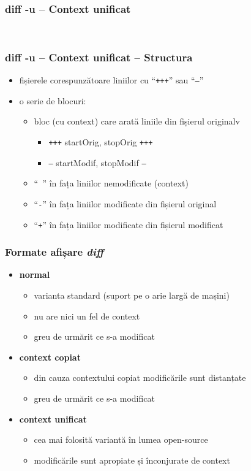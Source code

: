 \documentclass{beamer}
\begin{document}
\begin{frame}
  \frametitle{\textbf{diff -u} – Context unificat}
  \tt{}
\end{frame}

\begin{frame}
  \frametitle{\textbf{diff -u} – Context unificat – Structura}
  \begin{itemize}
  \item fișierele corespunzătoare liniilor cu ``\texttt{\texttt{+++}}'' sau ``\texttt{---}''
    \item o serie de blocuri:
      \begin{itemize}
      \item bloc (cu context) care arată liniile din fișierul originalv
        \begin{itemize} 
        \item \texttt{+++} startOrig, stopOrig \texttt{+++}
        \item \texttt{---} startModif, stopModif \texttt{---}
        \end{itemize}
      \item ``\texttt{ }'' în fața liniilor nemodificate (context)
      \item ``\texttt{-}'' în fața liniilor modificate din fișierul original
      \item ``\texttt{+}'' în fața liniilor modificate din fișierul modificat
      \end{itemize}
  \end{itemize}
\end{frame}

\begin{frame}
  \frametitle{\textbf Formate afișare \textit{diff}}
  \begin{itemize}[<+->]
    \item \textbf{normal}
      \begin{itemize}[<+->]
        \item varianta standard (suport pe o arie largă de mașini)
        \item nu are nici un fel de context
        \item greu de urmărit ce s-a modificat
      \end{itemize}

    \item \textbf{context copiat}
      \begin{itemize}
        \item din cauza contextului copiat modificările sunt distanțate
        \item greu de urmărit ce s-a modificat
      \end{itemize}
      
    \item \textbf{context unificat}
      \begin{itemize}
        \item cea mai folosită variantă în lumea open-source
        \item modificările sunt apropiate și înconjurate de context
      \end{itemize}
  \end{itemize}
\end{frame}
\end{document}
